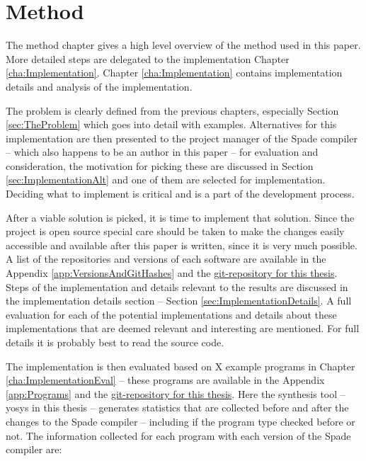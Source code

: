 \chapter{Method}
The method chapter gives a high level overview of the method used in this paper. More detailed steps are delegated to the implementation Chapter \ref{cha:Implementation}. Chapter \ref{cha:Implementation} contains implementation details and analysis of the implementation.

The problem is clearly defined from the previous chapters, especially Section \ref{sec:TheProblem} which goes into detail with examples. Alternatives for this implementation are then presented to the project manager of the Spade compiler -- which also happens to be an author in this paper -- for evaluation and consideration, the motivation for picking these are discussed in Section \ref{sec:ImplementationAlt} and one of them are selected for implementation. Deciding what to implement is critical and is a part of the development process.

After a viable solution is picked, it is time to implement that solution. Since the project is open source special care should be taken to make the changes easily accessible and available after this paper is written, since it is very much possible. A list of the repositories and versions of each software are available in the Appendix \ref{app:VersionsAndGitHashes} and the \href{https://github.com/FredTheDino/thesis-spade-lang}{git-repository for this thesis}. Steps of the implementation and details relevant to the results are discussed in the implementation details section -- Section \ref{sec:ImplementationDetails}. A full evaluation for each of the potential implementations and details about these implementations that are deemed relevant and interesting are mentioned. For full details it is probably best to read the source code. 

The implementation is then evaluated based on X example programs in Chapter \ref{cha:ImplementationEval} -- these programs are available in the Appendix \ref{app:Programs} and the \href{https://github.com/FredTheDino/thesis-spade-lang}{git-repository for this thesis}. Here the synthesis tool -- yosys in this thesis -- generates statistics that are collected before and after the changes to the Spade compiler -- including if the program type checked before or not. The information collected for each program with each version of the Spade compiler are:

